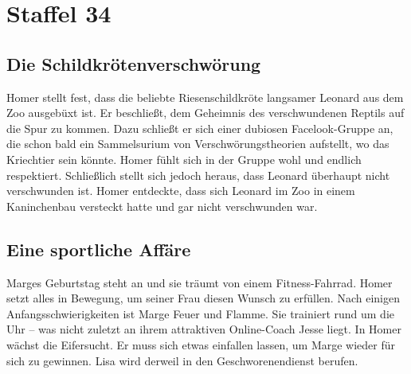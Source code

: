 \section{Staffel 34}

\subsection{Die Schildkrötenverschwörung}\label{UABF16}
Homer stellt fest, dass die beliebte Riesenschildkröte langsamer Leonard aus dem Zoo ausgebüxt ist. Er beschließt, dem Geheimnis des verschwundenen Reptils auf die Spur zu kommen. Dazu schließt er sich einer dubiosen Facelook-Gruppe an, die schon bald ein Sammelsurium von Verschwörungstheorien aufstellt, wo das Kriechtier sein könnte. Homer fühlt sich in der Gruppe wohl und endlich respektiert. Schließlich stellt sich jedoch heraus, dass Leonard überhaupt nicht verschwunden ist. Homer entdeckte, dass sich Leonard im Zoo in einem Kaninchenbau versteckt hatte und gar nicht verschwunden war.


\subsection{Eine sportliche Affäre}
Marges Geburtstag steht an und sie träumt von einem Fitness-Fahrrad. Homer setzt alles in Bewegung, um seiner Frau diesen Wunsch zu erfüllen. Nach einigen Anfangsschwierigkeiten ist Marge Feuer und Flamme. Sie trainiert rund um die Uhr -- was nicht zuletzt an ihrem attraktiven Online-Coach Jesse liegt. In Homer wächst die Eifersucht. Er muss sich etwas einfallen lassen, um Marge wieder für sich zu gewinnen. Lisa wird derweil in den Geschworenendienst berufen.


